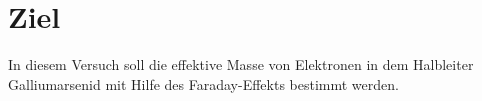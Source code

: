 \section{Ziel}
\label{sec:Ziel}
 In diesem Versuch soll die effektive Masse von Elektronen in dem Halbleiter Galliumarsenid mit Hilfe des Faraday-Effekts bestimmt werden.
